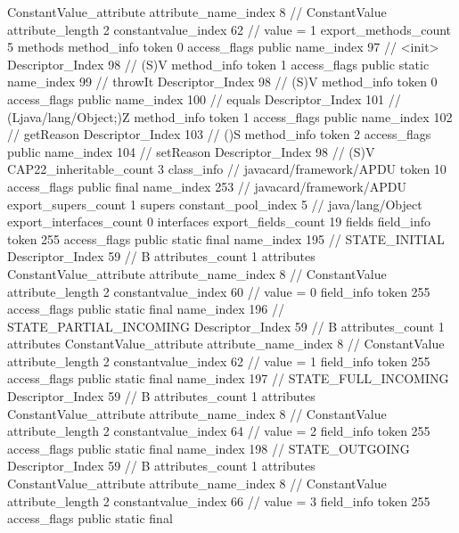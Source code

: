 {{{{{{				ConstantValue_attribute {
					attribute_name_index	8		// ConstantValue
					attribute_length	2
					constantvalue_index	62		// value = 1
				}
				}
			}
			}
			export_methods_count	5
			methods {
				method_info {
					token	0
					access_flags	public
					name_index	97		// <init>
					Descriptor_Index	98		// (S)V
				}
				method_info {
					token	1
					access_flags	public static
					name_index	99		// throwIt
					Descriptor_Index	98		// (S)V
				}
				method_info {
					token	0
					access_flags	public
					name_index	100		// equals
					Descriptor_Index	101		// (Ljava/lang/Object;)Z
				}
				method_info {
					token	1
					access_flags	public
					name_index	102		// getReason
					Descriptor_Index	103		// ()S
				}
				method_info {
					token	2
					access_flags	public
					name_index	104		// setReason
					Descriptor_Index	98		// (S)V
				}
			}
			CAP22_inheritable_count	3
		}
		class_info {		// javacard/framework/APDU
			token	10
			access_flags	public final
			name_index	253		// javacard/framework/APDU
			export_supers_count	1
			supers {
				constant_pool_index	5		// java/lang/Object
			}
			export_interfaces_count	0
			interfaces {
			}
			export_fields_count	19
			fields {
			field_info {
				token	255
				access_flags	public static final
				name_index	195		// STATE_INITIAL
				Descriptor_Index	59		// B
				attributes_count	1
				attributes {
				ConstantValue_attribute {
					attribute_name_index	8		// ConstantValue
					attribute_length	2
					constantvalue_index	60		// value = 0
				}
				}
			}
			field_info {
				token	255
				access_flags	public static final
				name_index	196		// STATE_PARTIAL_INCOMING
				Descriptor_Index	59		// B
				attributes_count	1
				attributes {
				ConstantValue_attribute {
					attribute_name_index	8		// ConstantValue
					attribute_length	2
					constantvalue_index	62		// value = 1
				}
				}
			}
			field_info {
				token	255
				access_flags	public static final
				name_index	197		// STATE_FULL_INCOMING
				Descriptor_Index	59		// B
				attributes_count	1
				attributes {
				ConstantValue_attribute {
					attribute_name_index	8		// ConstantValue
					attribute_length	2
					constantvalue_index	64		// value = 2
				}
				}
			}
			field_info {
				token	255
				access_flags	public static final
				name_index	198		// STATE_OUTGOING
				Descriptor_Index	59		// B
				attributes_count	1
				attributes {
				ConstantValue_attribute {
					attribute_name_index	8		// ConstantValue
					attribute_length	2
					constantvalue_index	66		// value = 3
				}
				}
			}
			field_info {
				token	255
				access_flags	public static final
}}}}}
